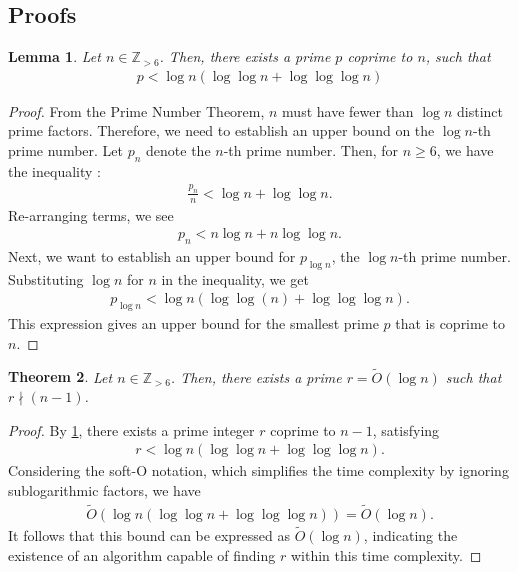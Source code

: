 \documentclass{article}
\theoremstyle{plain}
\newtheorem{theorem}{Theorem}
\newtheorem{lemma}[theorem]{Lemma}
\theoremstyle{definition}
\newcommand{\Z}{\mathbb{Z}}
\begin{document}
\subsection{Proofs}
\begin{lemma} \label{proof:leastcoprime}
Let $n \in \Z_{>6}$. Then, there exists a prime $p$ coprime to $n$, such that
\begin{align*}
    p < \log n \left( \log\log n + \log\log\log n \right)
\end{align*}
\end{lemma}
\begin{proof}
From the Prime Number Theorem, $n$ must have fewer than $\log n$ distinct prime factors. Therefore, we need to establish an upper bound on the $\log n$-th prime number. Let $p_n$ denote the $n$-th prime number. Then, for $n \geq 6$, we have the inequality \cite{rosser1941primebounds}:
\begin{align*}
    \frac{p_n}{n} < \log n + \log\log n .
\end{align*}
Re-arranging terms, we see
\begin{align*}
    p_n < n \log n + n \log\log n .
\end{align*}
Next, we want to establish an upper bound for $p_{\log n}$, the $\log n$-th prime number. Substituting $\log n$ for $n$ in the inequality, we get
\begin{align*}
p_{\log n} < \log n \left( \log\log (n) + \log\log\log n \right) .
\end{align*}
This expression gives an upper bound for the smallest prime $p$ that is coprime to $n$.
\end{proof}
\begin{theorem} \label{proof:leastcoprimesofto}
Let $n \in \Z_{>6}$. Then, there exists a prime $r = \tilde{O}(\log n)$ such that $r \nmid (n-1)$.
\end{theorem}
\begin{proof}
By \cref{proof:leastcoprime}, there exists a prime integer $r$ coprime to $n-1$, satisfying
\begin{align*}
    r < \log n \left( \log\log n + \log\log\log n \right) .
\end{align*}
Considering the soft-O notation, which simplifies the time complexity by ignoring sublogarithmic factors, we have
\begin{align*}
    \tilde{O}(\log n \left( \log\log n + \log\log\log n \right)) = \tilde{O}(\log n).
\end{align*}
It follows that this bound can be expressed as $\tilde{O}(\log n)$, indicating the existence of an algorithm capable of finding $r$ within this time complexity.
\end{proof}
\end{document}
